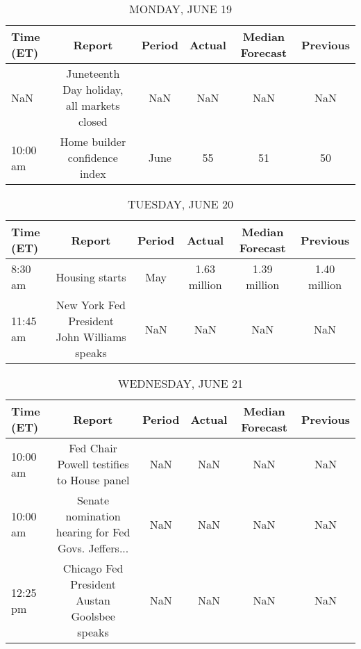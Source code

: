 \documentclass{article}%
\begin{document}
%
\normalsize%


\begin{table}[htbp]%
\caption{MONDAY, JUNE 19}%
\centering%
\begin{adjustbox}{width=1\textwidth}%
\begin{tabular}{lccccc}
\toprule
Time (ET) &                                     Report & Period & Actual & Median Forecast & Previous \\
\midrule
      NaN & Juneteenth Day holiday, all markets closed &    NaN &    NaN &             NaN &      NaN \\
 10:00 am &              Home builder confidence index &   June &     55 &              51 &       50 \\
\bottomrule
\end{tabular}
%
\end{adjustbox}%
\end{table}

%


\begin{table}[htbp]%
\caption{TUESDAY, JUNE 20}%
\centering%
\begin{adjustbox}{width=1\textwidth}%
\begin{tabular}{lccccc}
\toprule
Time (ET) &                                      Report & Period &       Actual & Median Forecast &     Previous \\
\midrule
  8:30 am &                              Housing starts &    May & 1.63 million &    1.39 million & 1.40 million \\
 11:45 am & New York Fed President John Williams speaks &    NaN &          NaN &             NaN &          NaN \\
\bottomrule
\end{tabular}
%
\end{adjustbox}%
\end{table}

%


\begin{table}[htbp]%
\caption{WEDNESDAY, JUNE 21}%
\centering%
\begin{adjustbox}{width=1\textwidth}%
\begin{tabular}{lccccc}
\toprule
Time (ET) &                                             Report & Period & Actual & Median Forecast & Previous \\
\midrule
 10:00 am &          Fed Chair Powell testifies to House panel &    NaN &    NaN &             NaN &      NaN \\
 10:00 am & Senate nomination hearing for Fed Govs. Jeffers... &    NaN &    NaN &             NaN &      NaN \\
 12:25 pm &       Chicago Fed President Austan Goolsbee speaks &    NaN &    NaN &             NaN &      NaN \\
\bottomrule
\end{tabular}
%
\end{adjustbox}%
\end{table}
\end{document}
